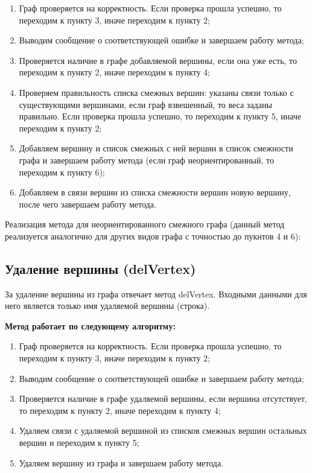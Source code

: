 \documentclass[bachelor, och, pract]{SCWorks}
\begin{document}
\begin{enumerate}
  \item {Граф проверяется на корректность. Если проверка прошла успешно,
  то переходим к пункту 3, иначе переходим к пункту 2;}
  \item {Выводим сообщение о соответствующей ошибке и завершаем работу метода;}
  \item {Проверяется наличие в графе добавляемой вершины, если она уже есть,
  то переходим к пункту 2, иначе переходим к пункту 4;}
  \item {Проверяем правильность списка смежных вершин: указаны связи только с
  существующими вершинами, если граф взвешенный, то веса заданы правильно. Если проверка прошла успешно,
  то переходим к пункту 5, иначе переходим к пункту 2;}
  \item {Добавляем вершину и список смежных с ней вершин в список смежности графа и завершаем
  работу метода (если граф неориентированный, то переходим к пункту 6);}
  \item {Добавляем в связи вершин из списка смежности вершин новую вершину, после чего
  завершаем работу метода.}
\end{enumerate}

Реализация метода для неориентированного смежного графа (данный метод реализуется
аналогично для других видов графа с точностью до пукнтов 4 и 6):
\bigskip


\bigskip

\subsection{Удаление вершины (delVertex)}

За удаление вершины из графа отвечает метод
delVertex. Входными данными для него является только
имя удаляемой вершины (строка).
\bigskip

\textbf{Метод работает по следующему алгоритму:}

\begin{enumerate}
  \item {Граф проверяется на корректность. Если проверка прошла успешно,
  то переходим к пункту 3, иначе переходим к пункту 2;}
  \item {Выводим сообщение о соответствующей ошибке и завершаем работу метода;}
  \item {Проверяется наличие в графе удаляемой вершины, если вершина отсутствует,
  то переходим к пункту 2, иначе переходим к пункту 4;}
  \item {Удаляем связи с удаляемой вершиной из списков смежных вершин остальных вершин и
  переходим к пункту 5;}
  \item {Удаляем вершину из графа и завершаем работу метода.}
\end{enumerate}
\end{document}
